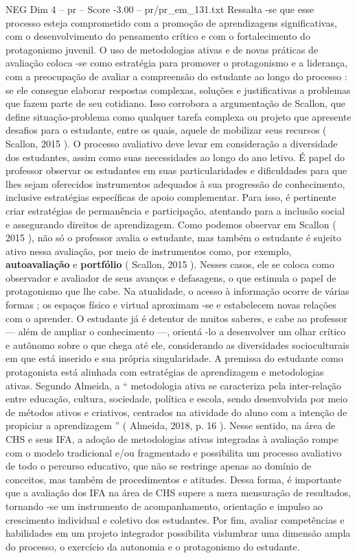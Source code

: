 \begin{textsample}{NEG Dim 4 – pr – Score -3.00 – pr/pr\_em\_131.txt}
Ressalta -se que esse processo esteja comprometido com a promoção de aprendizagens significativas, com o desenvolvimento do pensamento crítico e com o fortalecimento do protagonismo juvenil.
O uso de metodologias ativas e de novas práticas de avaliação coloca -se como estratégia para promover o protagonismo e a liderança, com a preocupação de avaliar a compreensão do estudante ao longo do processo : se ele consegue elaborar respostas complexas, soluções e justificativas a problemas que fazem parte de seu cotidiano.
Isso corrobora a argumentação de Scallon, que define situação-problema como qualquer tarefa complexa ou projeto que apresente desafios para o estudante, entre os quais, aquele de mobilizar seus recursos ( Scallon, 2015 ).
O processo avaliativo deve levar em consideração a diversidade dos estudantes, assim como suas necessidades ao longo do ano letivo.
É papel do professor observar os estudantes em suas particularidades e dificuldades para que lhes sejam oferecidos instrumentos adequados à sua progressão de conhecimento, inclusive estratégias específicas de apoio complementar.
Para isso, é pertinente criar estratégias de permanência e participação, atentando para a inclusão social e assegurando direitos de aprendizagem.
Como podemos observar em Scallon ( 2015 ), não só o professor avalia o estudante, mas também o estudante é sujeito ativo nessa avaliação, por meio de instrumentos como, por exemplo, \textbf{autoavaliação} e \textbf{portfólio} ( Scallon, 2015 ).
Nesses casos, ele se coloca como observador e avaliador de seus avanços e defasagens, o que estimula o papel de protagonismo que lhe cabe.
Na atualidade, o acesso à informação ocorre de várias formas ; os espaços físico e virtual aproximam -se e estabelecem novas relações com o aprender.
O estudante já é detentor de muitos saberes, e cabe ao professor — além de ampliar o conhecimento —, orientá -lo a desenvolver um olhar crítico e autônomo sobre o que chega até ele, considerando as diversidades socioculturais em que está inserido e sua própria singularidade.
A premissa do estudante como protagonista está alinhada com estratégias de aprendizagem e metodologias ativas.
Segundo Almeida, a “ metodologia ativa se caracteriza pela inter-relação entre educação, cultura, sociedade, política e escola, sendo desenvolvida por meio de métodos ativos e criativos, centrados na atividade do aluno com a intenção de propiciar a aprendizagem ” ( Almeida, 2018, p. 16 ).
Nesse sentido, na área de CHS e seus IFA, a adoção de metodologias ativas integradas à avaliação rompe com o modelo tradicional e/ou fragmentado e possibilita um processo avaliativo de todo o percurso educativo, que não se restringe apenas ao domínio de conceitos, mas também de procedimentos e atitudes.
Dessa forma, é importante que a avaliação dos IFA na área de CHS supere a mera mensuração de resultados, tornando -se um instrumento de acompanhamento, orientação e impulso ao crescimento individual e coletivo dos estudantes.
Por fim, avaliar competências e habilidades em um projeto integrador possibilita vislumbrar uma dimensão ampla do processo, o exercício da autonomia e o protagonismo do estudante.

\end{textsample}
